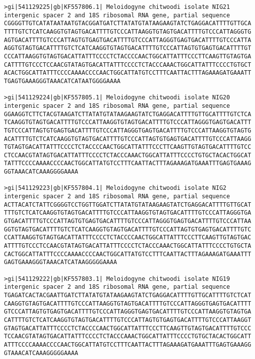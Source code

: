 \documentclass[11pt]{article}
\begin{document}
\begin{Verbatim}[commandchars=\\\{\}]
>gi|541129225|gb|KF557806.1| Meloidogyne chitwoodi isolate NIG21 intergenic spacer 2 and 18S ribosomal RNA gene, partial sequence
CGGGGTTGTCATATAATAATGTACGGATGATCTTATATGTATAAGAAGTATCTGAGGACATTTTGTTGCA
TTTTGTCTCATCAAGGTGTAGTGACATTTTGTCCCATTAAGGTGTAGTGACATTTTGTCCCATTAGGGTG
AGTGACATTTTGTCCCATTAGTGTGAGTGACATTTTGTCCCATTAGGGTGAGTGACATTTTGTCCCATTA
AGGTGTAGTGACATTTTGTCTCATCAAGGTGTAGTGACATTTTGTCCCATTAGTGTGAGTGACATTTTGT
CCCATTAAGGTGTAGTGACATTATTTCCCCTCTACCCCAACTGGCATTATTTCCCTTCAAGTTGTAGTGA
CATTTTGTCCCTCCAACGTATAGTGACATTATTTCCCCTCTACCCAAACTGGCATTATTTCCCCTGTGCT
ACACTGGCATTATTTCCCCAAAACCCCAACTGGCATTATGTCCTTTCAATTACTTTAGAAAGATGAAATT
TGAGTGAAAGGGTAAACATCATAATGGGGAAAA

>gi|541129224|gb|KF557805.1| Meloidogyne chitwoodi isolate NIG20 intergenic spacer 2 and 18S ribosomal RNA gene, partial sequence
GGAAGGTCTTCTACGTAAGATCTTATATGTATAAGAAGTATCTGAGGACATTTTGTTGCATTTTGTCTCA
TCAAGGTGTAGTGACATTTTGTCCCATTAAGGTGTAGTGACATTTTGTCCCATTAGGGTGAGTGACATTT
TGTCCCATTAGTGTGAGTGACATTTTGTCCCATTAGGGTGAGTGACATTTTGTCCCATTAAGGTGTAGTG
ACATTTTGTCTCATCAAGGTGTAGTGACATTTTGTCCCATTAGTGTGAGTGACATTTTGTCCCATTAAGG
TGTAGTGACATTATTTCCCCTCTACCCCAACTGGCATTATTTCCCTTCAAGTTGTAGTGACATTTTGTCC
CTCCAACGTATAGTGACATTATTTCCCCTCTACCCAAACTGGCATTATTTCCCCTGTGCTACACTGGCAT
TATTTCCCCAAAACCCCAACTGGCATTATGTCCTTTCAATTACTTTAGAAAGATGAAATTTGAGTGAAAG
GGTAAACATCAAAGGGGAAAA

>gi|541129223|gb|KF557804.1| Meloidogyne chitwoodi isolate NIG2 intergenic spacer 2 and 18S ribosomal RNA gene, partial sequence
ACTTACATCTATTCGGGGTCCTGGTTGGATCTTATATGTATAAGAAGTATCTGAGGACATTTTGTTGCAT
TTTGTCTCATCAAGGTGTAGTGACATTTTGTCCCATTAAGGTGTAGTGACATTTTGTCCCATTAGGGTGA
GTGACATTTTGTCCCATTAGTGTGAGTGACATTTTGTCCCATTAGGGTGAGTGACATTTTGTCCCATTAA
GGTGTAGTGACATTTTGTCTCATCAAGGTGTAGTGACATTTTGTCCCATTAGTGTGAGTGACATTTTGTC
CCATTAAGGTGTAGTGACATTATTTCCCCTCTACCCCAACTGGCATTATTTCCCTTCAAGTTGTAGTGAC
ATTTTGTCCCTCCAACGTATAGTGACATTATTTCCCCTCTACCCAAACTGGCATTATTTCCCCTGTGCTA
CACTGGCATTATTTCCCCAAAACCCCAACTGGCATTATGTCCTTTCAATTACTTTAGAAAGATGAAATTT
GAGTGAAAGGGTAAACATCATAAGGGGGAAAA

>gi|541129222|gb|KF557803.1| Meloidogyne chitwoodi isolate NIG19 intergenic spacer 2 and 18S ribosomal RNA gene, partial sequence
TGAGATCACTACGAATTGATCTTATATGTATAAGAAGTATCTGAGGACATTTTGTTGCATTTTGTCTCAT
CAAGGTGTAGTGACATTTTGTCCCATTAAGGTGTAGTGACATTTTGTCCCATTAGGGTGAGTGACATTTT
GTCCCATTAGTGTGAGTGACATTTTGTCCCATTAGGGTGAGTGACATTTTGTCCCATTAAGGTGTAGTGA
CATTTTGTCTCATCAAGGTGTAGTGACATTTTGTCCCATTAGTGTGAGTGACATTTTGTCCCATTAAGGT
GTAGTGACATTATTTCCCCTCTACCCCAACTGGCATTATTTCCCTTCAAGTTGTAGTGACATTTTGTCCC
TCCAACGTATAGTGACATTATTTCCCCTCTACCCAAACTGGCATTATTTCCCCTGTGCTACACTGGCATT
ATTTCCCCAAAACCCCAACTGGCATTATGTCCTTTCAATTACTTTAGAAAGATGAAATTTGAGTGAAAGG
GTAAACATCAAAGGGGGAAAA


\end{Verbatim}
\end{document}
